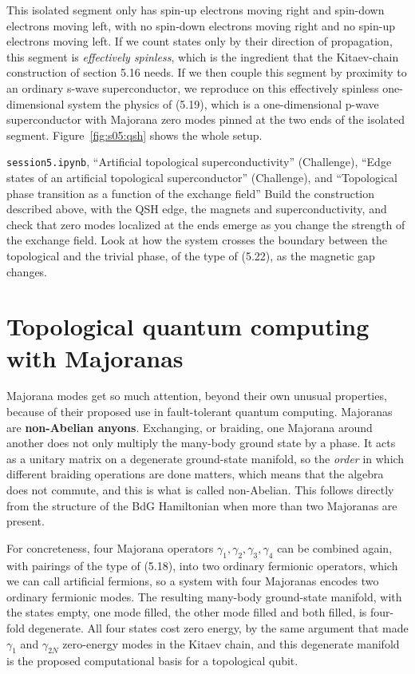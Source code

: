 This isolated segment only has spin-up electrons moving right and spin-down electrons moving left,
with no spin-down electrons moving right and no spin-up electrons moving left. If we count states
only by their direction of propagation, this segment is \emph{effectively spinless}, which is the
ingredient that the Kitaev-chain construction of section 5.16 needs. If we then couple this segment
by proximity to an ordinary s-wave superconductor, we reproduce on this effectively spinless
one-dimensional system the physics of (5.19), which is a one-dimensional p-wave superconductor with
Majorana zero modes pinned at the two ends of the isolated segment. Figure~\ref{fig:s05:qsh} shows
the whole setup.



\begin{notebookbox}{\texttt{session5.ipynb}, ``Artificial topological superconductivity'' (Challenge), ``Edge states of an artificial topological superconductor'' (Challenge), and ``Topological phase transition as a function of the exchange field''}
Build the construction described above, with the QSH edge, the magnets and superconductivity, and
check that zero modes localized at the ends emerge as you change the strength of the exchange field.
Look at how the system crosses the boundary between the topological and the trivial phase, of the
type of (5.22), as the magnetic gap changes.
\end{notebookbox}

\section{Topological quantum computing with Majoranas}

Majorana modes get so much attention, beyond their own unusual properties, because of their
proposed use in fault-tolerant quantum computing. Majoranas are \textbf{non-Abelian anyons}.
Exchanging, or braiding, one Majorana around another does not only multiply the many-body ground
state by a phase. It acts as a unitary matrix on a degenerate ground-state manifold, so the
\emph{order} in which different braiding operations are done matters, which means that the algebra
does not commute, and this is what is called non-Abelian. This
follows directly from the structure of the BdG Hamiltonian when more than two Majoranas are present.

For concreteness, four Majorana operators $\gamma_1,\gamma_2,\gamma_3,\gamma_4$ can be combined
again, with pairings of the type of (5.18), into two ordinary fermionic operators, which we can call
artificial fermions, so a system with four Majoranas encodes two ordinary fermionic modes. The
resulting many-body ground-state manifold, with the states empty, one mode filled, the other mode
filled and both filled, is four-fold degenerate. All four states cost zero energy, by the same
argument that made $\gamma_1$ and $\gamma_{2N}$ zero-energy modes in the Kitaev chain, and this
degenerate manifold is the proposed computational basis for a topological qubit.

